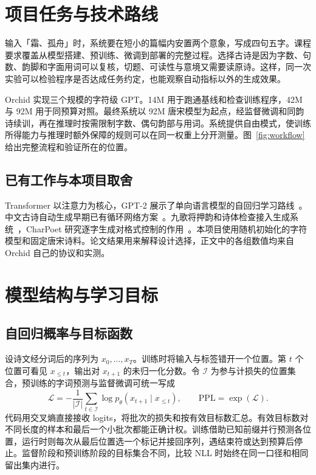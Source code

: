 \section{项目任务与技术路线}
\label{sec:task}

输入「霜、孤舟」时，系统要在短小的篇幅内安置两个意象，写成四句五字。课程要求覆盖从模型搭建、预训练、微调到部署的完整过程。选择古诗是因为字数、句数、韵脚和字面用词可以复核，切题、可读性与意境又需要读原诗。这样，同一次实验可以检验程序是否达成任务约定，也能观察自动指标以外的生成效果。

Orchid 实现三个规模的字符级 GPT。14M 用于跑通基线和检查训练程序，42M 与 92M 用于同预算对照。最终系统以 92M 唐宋模型为起点，经监督微调和同韵诗续训，再在推理时按需限制字数、偶句韵部与用词。系统提供自由模式，使训练所得能力与推理时额外保障的规则可以在同一权重上分开测量。图~\ref{fig:workflow} 给出完整流程和验证所在的位置。


\subsection{已有工作与本项目取舍}

Transformer 以注意力为核心，GPT-2 展示了单向语言模型的自回归学习路线~\cite{vaswani2017attention,radford2019language}。中文古诗自动生成早期已有循环网络方案~\cite{zhang-lapata-2014-chinese}。九歌将押韵和诗体检查接入生成系统~\cite{guo-etal-2019-jiuge}，CharPoet 研究逐字生成对格式控制的作用~\cite{yu-etal-2024-charpoet}。本项目使用随机初始化的字符模型和固定唐宋诗料。论文结果用来解释设计选择，正文中的各组数值均来自 Orchid 自己的协议和实测。

\section{模型结构与学习目标}
\label{sec:model}

\subsection{自回归概率与目标函数}

设诗文经分词后的序列为 $x_0,\ldots,x_T$。训练时将输入与标签错开一个位置。第 $t$ 个位置可看见 $x_{\le t}$，输出对 $x_{t+1}$ 的未归一化分数。令 $\mathcal I$ 为参与计损失的位置集合，预训练的字词预测与监督微调可统一写成
\begin{equation}
    \mathcal L =
    -\frac{1}{|\mathcal I|}\sum_{t\in\mathcal I}
    \log p_\theta(x_{t+1}\mid x_{\le t}),
    \qquad \mathrm{PPL}=\exp(\mathcal L).
    \label{eq:nll}
\end{equation}
代码用交叉熵直接接收 logits，将批次的损失和按有效目标数汇总。有效目标数对不同长度的样本和最后一个小批次都能正确计权。训练借助已知前缀并行预测各位置，运行时则每次从最后位置选一个标记并接回序列，遇结束符或达到预算后停止。监督阶段和预训练阶段的目标集合不同，比较 NLL 时始终在同一口径和相同留出集内进行。

